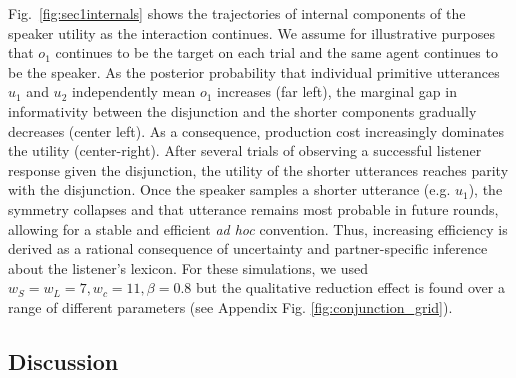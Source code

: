 Fig.~\ref{fig:sec1internals} shows the trajectories of internal components of the speaker utility as the interaction continues.
We assume for illustrative purposes that $o_1$ continues to be the target on each trial and the same agent continues to be the speaker.
As the posterior probability that individual primitive utterances $u_1$ and $u_2$ independently mean $o_1$ increases (far left), the marginal gap in informativity between the disjunction and the shorter components gradually decreases (center left).
As a consequence, production cost increasingly dominates the utility (center-right). 
After several trials of observing a successful listener response given the disjunction, the utility of the shorter utterances reaches parity with the disjunction.
Once the speaker samples a shorter utterance (e.g. $u_1$), the symmetry collapses and that utterance remains most probable in future rounds, allowing for a stable and efficient \emph{ad hoc} convention.
Thus, increasing efficiency is derived as a rational consequence of uncertainty and partner-specific inference about the listener's lexicon.
For these simulations, we used $w_S = w_L = 7, w_c = 11, \beta=0.8$ but the qualitative reduction effect is found over a range of different parameters (see Appendix Fig. \ref{fig:conjunction_grid}). 
%
%
%




\subsection{Discussion}

